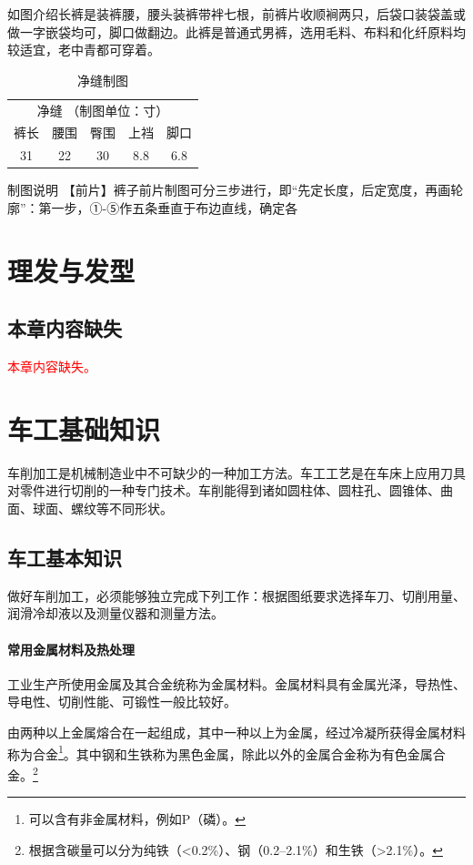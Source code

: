 \documentclass{ctexbook}
\begin{document}
如图介绍长裤是装裤腰，腰头装裤带袢七根，前裤片收顺裥两只，后袋口装袋盖或做一字嵌袋均可，脚口做翻边。此裤是普通式男裤，选用毛料、布料和化纤原料均较适宜，老中青都可穿着。

\begin{table}[htbp]
	\centering
	\caption{净缝制图}
	\begin{tabular}{ccccc}
		\multicolumn{5}{c}{净缝 （制图单位：寸）} \\
		裤长    & 腰围    & 臀围    & 上裆    & 脚口 \\
		31    & 22    & 30    & 8.8   & 6.8 \\
	\end{tabular}%
	\label{tab:jinfeng}%
\end{table}%

制图说明
【前片】裤子前片制图可分三步进行，即“先定长度，后定宽度，再画轮廓”：第一步，①-⑤作五条垂直于布边直线，确定各
\chapter{理发与发型}
\section{本章内容缺失}
\textcolor{red}{本章内容缺失。}
\chapter{车工基础知识}
车削加工是机械制造业中不可缺少的一种加工方法。车工工艺是在车床上应用刀具对零件进行切削的一种专门技术。车削能得到诸如圆柱体、圆柱孔、圆锥体、曲面、球面、螺纹等不同形状。
\section{车工基本知识}
做好车削加工，必须能够独立完成下列工作：根据图纸要求选择车刀、切削用量、润滑冷却液以及测量仪器和测量方法。
\subsubsection{常用金属材料及热处理}
工业生产所使用金属及其合金统称为金属材料。金属材料具有金属光泽，导热性、导电性、切削性能、可锻性一般比较好。

由两种以上金属熔合在一起组成，其中一种以上为金属，经过冷凝所获得金属材料称为合金\footnote{可以含有非金属材料，例如P（磷）。}。其中钢和生铁称为黑色金属，除此以外的金属合金称为有色金属合金。\footnote{根据含碳量可以分为纯铁（<0.2\%）、钢（0.2--2.1\%）和生铁（>2.1\%）。}
\end{document}
